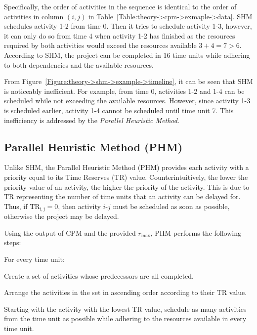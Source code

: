 Specifically, the order of activities in the sequence is identical to the order of activities in column $\left(i, j\right)$ in Table~\ref{Table:theory->cpm->exmaple->data}.
SHM schedules activity 1-2 from time 0.
Then it tries to schedule activity 1-3, however, it can only do so from time 4 when activity 1-2 has finished as the resources required by both activities would exceed the resources available $3 + 4 = 7 > 6$.
According to SHM, the project can be completed in 16 time units while adhering to both dependencies and the available resources.

From Figure~\ref{Figure:theory->shm->example->timeline}, it can be seen that SHM is noticeably inefficient.
For example, from time 0, activities 1-2 and 1-4 can be scheduled while not exceeding the available resources.
However, since activity 1-3 is scheduled earlier, activity 1-4 cannot be scheduled until time unit 7.
This inefficiency is addressed by the \textit{Parallel Heuristic Method}.



\subsection{Parallel Heuristic Method (PHM)}
Unlike SHM, the Parallel Heuristic Method (PHM) provides each activity with a priority equal to its Time Reserves (TR) value.
Counterintuitively, the lower the priority value of an activity, the higher the priority of the activity.
This is due to TR representing the number of time units that an activity can be delayed for.
Thus, if $\mathrm{TR_{i ,j}} = 0$, then activity $i$-$j$ must be scheduled as soon as possible, otherwise the project may be delayed.

Using the output of CPM and the provided $r_\mathrm{max}$, PHM performs the following steps:

\begin{tight_enumerate}
	\item For every time unit:
	\begin{tight_enumerate}
		\item Create a set of activities whose predecessors are all completed.
		\item Arrange the activities in the set in ascending order according to their TR value.
		\item Starting with the activity with the lowest TR value, schedule as many activities from the time unit as possible while adhering to the resources available in every time unit.
	\end{tight_enumerate}
\end{tight_enumerate}

